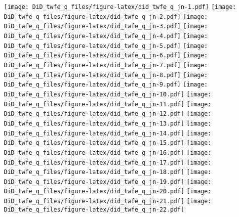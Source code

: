 \documentclass[
]{article}
\begin{document}
\texttt{[image: DiD\_twfe\_q\_files/figure-latex/did\_twfe\_q\_jn-1.pdf]}
\texttt{[image: DiD\_twfe\_q\_files/figure-latex/did\_twfe\_q\_jn-2.pdf]}
\texttt{[image: DiD\_twfe\_q\_files/figure-latex/did\_twfe\_q\_jn-3.pdf]}
\texttt{[image: DiD\_twfe\_q\_files/figure-latex/did\_twfe\_q\_jn-4.pdf]}
\texttt{[image: DiD\_twfe\_q\_files/figure-latex/did\_twfe\_q\_jn-5.pdf]}
\texttt{[image: DiD\_twfe\_q\_files/figure-latex/did\_twfe\_q\_jn-6.pdf]}
\texttt{[image: DiD\_twfe\_q\_files/figure-latex/did\_twfe\_q\_jn-7.pdf]}
\texttt{[image: DiD\_twfe\_q\_files/figure-latex/did\_twfe\_q\_jn-8.pdf]}
\texttt{[image: DiD\_twfe\_q\_files/figure-latex/did\_twfe\_q\_jn-9.pdf]}
\texttt{[image: DiD\_twfe\_q\_files/figure-latex/did\_twfe\_q\_jn-10.pdf]}
\texttt{[image: DiD\_twfe\_q\_files/figure-latex/did\_twfe\_q\_jn-11.pdf]}
\texttt{[image: DiD\_twfe\_q\_files/figure-latex/did\_twfe\_q\_jn-12.pdf]}
\texttt{[image: DiD\_twfe\_q\_files/figure-latex/did\_twfe\_q\_jn-13.pdf]}
\texttt{[image: DiD\_twfe\_q\_files/figure-latex/did\_twfe\_q\_jn-14.pdf]}
\texttt{[image: DiD\_twfe\_q\_files/figure-latex/did\_twfe\_q\_jn-15.pdf]}
\texttt{[image: DiD\_twfe\_q\_files/figure-latex/did\_twfe\_q\_jn-16.pdf]}
\texttt{[image: DiD\_twfe\_q\_files/figure-latex/did\_twfe\_q\_jn-17.pdf]}
\texttt{[image: DiD\_twfe\_q\_files/figure-latex/did\_twfe\_q\_jn-18.pdf]}
\texttt{[image: DiD\_twfe\_q\_files/figure-latex/did\_twfe\_q\_jn-19.pdf]}
\texttt{[image: DiD\_twfe\_q\_files/figure-latex/did\_twfe\_q\_jn-20.pdf]}
\texttt{[image: DiD\_twfe\_q\_files/figure-latex/did\_twfe\_q\_jn-21.pdf]}
\texttt{[image: DiD\_twfe\_q\_files/figure-latex/did\_twfe\_q\_jn-22.pdf]}
\end{document}
